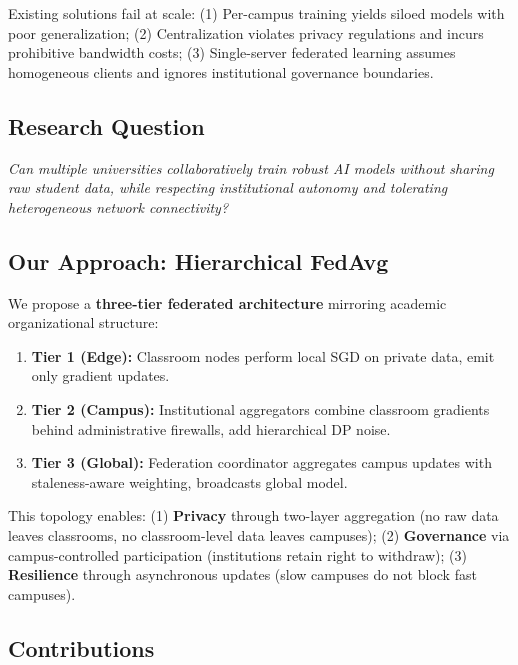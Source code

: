 \documentclass[conference]{IEEEtran}
\begin{document}
Existing solutions fail at scale: (1) Per-campus training yields siloed models with poor generalization; (2) Centralization violates privacy regulations and incurs prohibitive bandwidth costs; (3) Single-server federated learning assumes homogeneous clients and ignores institutional governance boundaries.

\subsection{Research Question}

\textit{Can multiple universities collaboratively train robust AI models without sharing raw student data, while respecting institutional autonomy and tolerating heterogeneous network connectivity?}

\subsection{Our Approach: Hierarchical FedAvg}

We propose a \textbf{three-tier federated architecture} mirroring academic organizational structure:

\begin{enumerate}
    \item \textbf{Tier 1 (Edge):} Classroom nodes perform local SGD on private data, emit only gradient updates.
    \item \textbf{Tier 2 (Campus):} Institutional aggregators combine classroom gradients behind administrative firewalls, add hierarchical DP noise.
    \item \textbf{Tier 3 (Global):} Federation coordinator aggregates campus updates with staleness-aware weighting, broadcasts global model.
\end{enumerate}

This topology enables: (1) \textbf{Privacy} through two-layer aggregation (no raw data leaves classrooms, no classroom-level data leaves campuses); (2) \textbf{Governance} via campus-controlled participation (institutions retain right to withdraw); (3) \textbf{Resilience} through asynchronous updates (slow campuses do not block fast campuses).

\subsection{Contributions}
\end{document}
